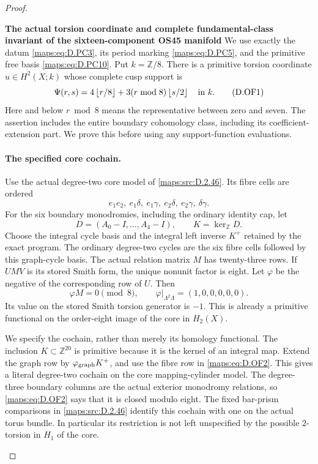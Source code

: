 \begin{proof}
\begin{enumerate}[label=\arabic*.,leftmargin=*]
\textbf{The actual torsion coordinate and complete fundamental-class
invariant of the sixteen-component OS45 manifold}
We use exactly the datum \eqref{maps:eq:D.PC3}, its period marking \eqref{maps:eq:D.PC5}, and the
primitive free basis \eqref{maps:eq:D.PC10}. Put \(k=\mathbb Z/8\).
There is a primitive torsion coordinate
\(u\in H^2(X;k)\) whose complete cusp support is
\[
 \Psi(r,s)=4\left\lfloor r/8\right\rfloor
       +3(r\bmod8)\left\lfloor s/2\right\rfloor
                                      \quad\hbox{in }k.       \tag{D.OF1}\label{maps:eq:D.OF1}
\]
Here and below \(r\bmod8\) means the representative between zero and
seven. The assertion includes the entire boundary cohomology class,
including its coefficient-extension part. We prove this before using
any support-function evaluations.

\paragraph{The specified core cochain.}
Use the actual degree-two core model of \ref{maps:src:D.2.46}. Its fibre cells are
ordered
\[
 e_1e_2,\ e_1\delta,\ e_1\gamma,\ e_2\delta,\
                                      e_2\gamma,\ \delta\gamma.
\]
For the six boundary monodromies, including the ordinary identity cap,
let
\[
 D=(A_0-I,\ldots,A_4-I),\qquad K=\ker_{\mathbb Z}D.
\]
Choose the integral cycle basis and the integral left inverse \(K^+\)
retained by the exact program. The ordinary degree-two cycles are the
six fibre cells followed by this graph-cycle basis. The actual
relation matrix \(M\) has twenty-three rows. If
\(UMV\) is its stored Smith form, the unique nonunit factor is eight.
Let \(\varphi\) be the negative of the corresponding row of \(U\).
Then
\[
 \varphi M=0\pmod8,\qquad
 \varphi|_{\Lambda^2\Lambda}=(1,0,0,0,0,0).                \tag{D.OF2}\label{maps:eq:D.OF2}
\]
Its value on the stored Smith torsion generator is \(-1\).
This is already a primitive functional on the order-eight image of
the core in \(H_2(X)\).

We specify the cochain, rather than merely its homology functional.
The inclusion \(K\subset\mathbb Z^{20}\) is primitive because it is
the kernel of an integral map. Extend the graph row by
\(\varphi_{\rm graph}K^+\), and use the fibre row in \eqref{maps:eq:D.OF2}.
This gives a literal degree-two cochain on the core mapping-cylinder
model. The degree-three boundary columns are the actual exterior
monodromy relations, so \eqref{maps:eq:D.OF2} says that it is closed modulo eight.
The fixed bar-prism comparisons in \ref{maps:src:D.2.46} identify this cochain with
one on the actual torus bundle. In particular its restriction is not
left unspecified by the possible \(2\)-torsion in \(H_1\) of the core.


\end{enumerate}
\end{proof}
